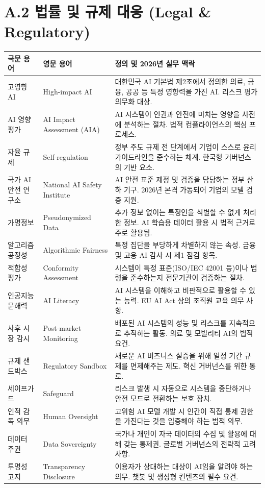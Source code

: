 \newpage
\section*{A.2 법률 및 규제 대응 (Legal \& Regulatory)}

\begin{table}[htbp]
\centering
\begin{tabularx}{\textwidth}{p{3.5cm}p{4cm}X}
\toprule
\textbf{국문 용어} & \textbf{영문 용어} & \textbf{정의 및 2026년 실무 맥락} \\
\midrule
고영향 AI & High-impact AI & 대한민국 AI 기본법 제2조에서 정의한 의료, 금융, 공공 등 특정 영향력을 가진 AI. 리스크 평가 의무화 대상. \\
\midrule
AI 영향 평가 & AI Impact Assessment (AIA) & AI 시스템이 인권과 안전에 미치는 영향을 사전에 분석하는 절차. 법적 컴플라이언스의 핵심 프로세스. \\
\midrule
자율 규제 & Self-regulation & 정부 주도 규제 전 단계에서 기업이 스스로 윤리 가이드라인을 준수하는 체계. 한국형 거버넌스의 기반 요소. \\
\midrule
국가 AI 안전 연구소 & National AI Safety Institute & AI 안전 표준 제정 및 검증을 담당하는 정부 산하 기구. 2026년 본격 가동되어 기업의 모델 검증 지원. \\
\midrule
가명정보 & Pseudonymized Data & 추가 정보 없이는 특정인을 식별할 수 없게 처리한 정보. AI 학습용 데이터 활용 시 법적 근거로 주로 활용됨. \\
\midrule
알고리즘 공정성 & Algorithmic Fairness & 특정 집단을 부당하게 차별하지 않는 속성. 금융 및 고용 AI 감사 시 제1 점검 항목. \\
\midrule
적합성 평가 & Conformity Assessment & 시스템이 특정 표준(ISO/IEC 42001 등)이나 법령을 준수하는지 전문기관이 검증하는 절차. \\
\midrule
인공지능 문해력 & AI Literacy & AI 시스템을 이해하고 비판적으로 활용할 수 있는 능력. EU AI Act 상의 조직원 교육 의무 사항. \\
\midrule
사후 시장 감시 & Post-market Monitoring & 배포된 AI 시스템의 성능 및 리스크를 지속적으로 추적하는 활동. 의료 및 모빌리티 AI의 법적 요건. \\
\midrule
규제 샌드박스 & Regulatory Sandbox & 새로운 AI 비즈니스 실증을 위해 일정 기간 규제를 면제해주는 제도. 혁신 거버넌스를 위한 통로. \\
\midrule
세이프가드 & Safeguard & 리스크 발생 시 자동으로 시스템을 중단하거나 안전 모드로 전환하는 보호 장치. \\
\midrule
인적 감독 의무 & Human Oversight & 고위험 AI 모델 개발 시 인간이 직접 통제 권한을 가진다는 것을 입증해야 하는 법적 의무. \\
\midrule
데이터 주권 & Data Sovereignty & 국가나 개인이 자국 데이터의 수집 및 활용에 대해 갖는 통제권. 글로벌 거버넌스의 전략적 고려사항. \\
\midrule
투명성 고지 & Transparency Disclosure & 이용자가 상대하는 대상이 AI임을 알려야 하는 의무. 챗봇 및 생성형 컨텐츠의 필수 요건. \\
\bottomrule
\end{tabularx}
\end{table}

